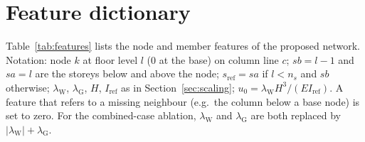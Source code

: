 \appendix

\section{Feature dictionary}\label{app:features}
Table~\ref{tab:features} lists the node and member features of the proposed network. Notation: node $k$ at floor level $l$ (0 at the base) on column line $c$; $sb=l-1$ and $sa=l$ are the storeys below and above the node; $s_\mathrm{ref}=sa$ if $l<n_s$ and $sb$ otherwise; $\lambda_\mathrm{W}$, $\lambda_\mathrm{G}$, $H$, $I_\mathrm{ref}$ as in Section~\ref{sec:scaling}; $u_0=\lambda_\mathrm{W}H^3/(EI_\mathrm{ref})$. A feature that refers to a missing neighbour (e.g.\ the column below a base node) is set to zero. For the combined-case ablation, $\lambda_\mathrm{W}$ and $\lambda_\mathrm{G}$ are both replaced by $|\lambda_\mathrm{W}|+\lambda_\mathrm{G}$.

